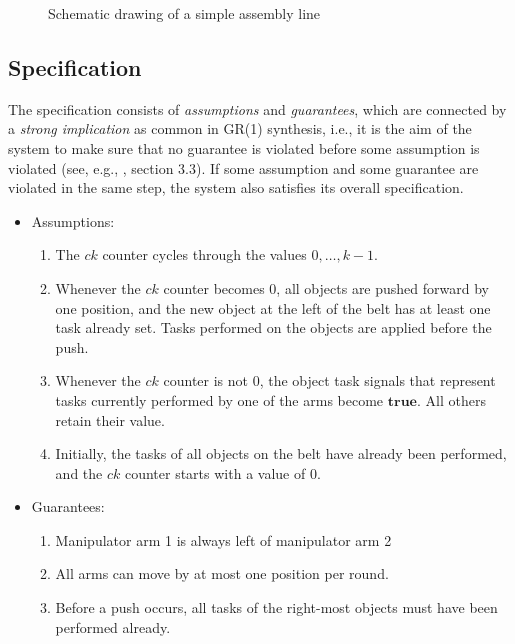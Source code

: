 \documentclass[a4paper,10pt]{IEEEtran}
\begin{document}
\begin{figure}[t]
\caption{Schematic drawing of a simple assembly line}
\label{fig:assemblyLineDrawing}
\end{figure}

\subsection{Specification}
\noindent The specification consists of \emph{assumptions} and \emph{guarantees}, which are connected by a \emph{strong implication} as common in GR(1) synthesis, i.e., it is the aim of the system to make sure that no guarantee is violated before some assumption is violated (see, e.g., \cite{DBLP:journals/jcss/BloemJPPS12}, section 3.3). If some assumption and some guarantee are violated in the same step, the system also satisfies its overall specification.
\begin{itemize}
\item Assumptions:
\begin{enumerate}
\item The $\mathit{ck}$ counter cycles through the values $0, \ldots, k-1$.
\item Whenever the $\mathit{ck}$ counter becomes $0$, all objects are pushed forward by one position, and the new object at the left of the belt has at least one task already set. Tasks performed on the objects are applied before the push. \label{item:NoDouble}
\item Whenever the $\mathit{ck}$ counter is not $0$, the object task signals that represent tasks currently performed by one of the arms become $\mathbf{true}$. All others retain their value.
\item Initially, the tasks of all objects on the belt have already been performed, and the $\mathit{ck}$ counter starts with a value of $0$.
\end{enumerate}
\item Guarantees:
\begin{enumerate}
\item Manipulator arm 1 is always left of manipulator arm 2
\item All arms can move by at most one position per round.
\item Before a push occurs, all tasks of the right-most objects must have been performed already.
\end{enumerate}
\end{itemize}
\end{document}
